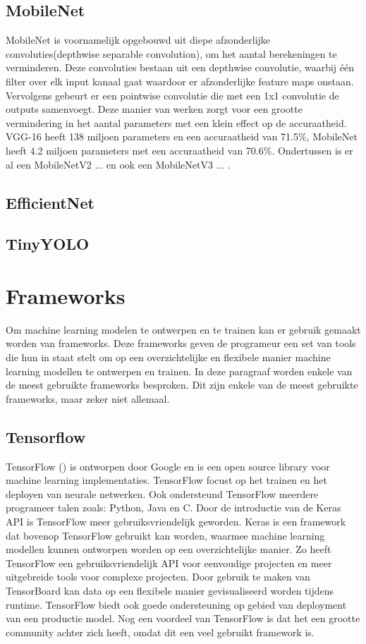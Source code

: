 \subsection{MobileNet}
MobileNet is voornamelijk opgebouwd uit diepe afzonderlijke convoluties(depthwise separable convolution), om het aantal berekeningen te verminderen.
Deze convoluties bestaan uit een depthwise convolutie, waarbij \'e\'en filter over elk input kanaal gaat waardoor er afzonderlijke feature maps onstaan.
Vervolgens gebeurt er een pointwise convolutie die met een 1x1 convolutie de outputs samenvoegt.
Deze manier van werken zorgt voor een grootte vermindering in het aantal parameters met een klein effect op de accuraatheid.
VGG-16 heeft 138 miljoen parameters en een accuraatheid van 71.5\%, MobileNet heeft 4.2 miljoen parameters met een accuraatheid van 70.6\%.
Ondertussen is er al een MobileNetV2 ... en ook een MobileNetV3 ... .

\subsection{EfficientNet}


\subsection{TinyYOLO}

\section{Frameworks}
Om machine learning modelen te ontwerpen en te trainen kan er gebruik gemaakt worden van frameworks.
Deze frameworks geven de programeur een set van tools die hun in staat stelt om op een overzichtelijke en flexibele manier machine learning modellen te ontwerpen en trainen.
In deze paragraaf worden enkele van de meest gebruikte frameworks besproken.
Dit zijn enkele van de meest gebruikte frameworks, maar zeker niet allemaal.

\subsection{Tensorflow}
TensorFlow (\cite{abadi_tensorflow_2016}) is ontworpen door Google en is een open source library voor machine learning implementaties.
TensorFlow focust op het trainen en het deployen van neurale netwerken.
Ook ondersteund TensorFlow meerdere programeer talen zoals: Python, Java en C.
Door de introductie van de Keras API is TensorFlow meer gebruiksvriendelijk geworden.
Keras is een framework dat bovenop TensorFlow gebruikt kan worden, waarmee machine learning modellen kunnen ontworpen worden op een overzichtelijke manier.
Zo heeft TensorFlow een gebruiksvriendelijk API voor eenvoudige projecten en meer uitgebreide tools voor complexe projecten.
Door gebruik te maken van TensorBoard kan data op een flexibele manier gevisualiseerd worden tijdens runtime. 
TensorFlow biedt ook goede ondersteuning op gebied van deployment van een productie model.
Nog een voordeel van TensorFlow is dat het een grootte community achter zich heeft, omdat dit een veel gebruikt framework is.

